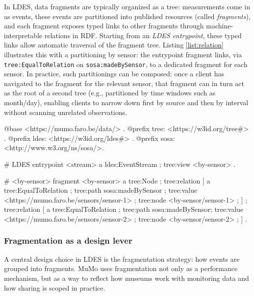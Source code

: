 In LDES, data fragments are typically organized as a tree: measurements
come in as events, these events are partitioned into published resources
(called \emph{fragments}), and each fragment exposes typed links to
other fragments through machine-interpretable relations in RDF. Starting
from an \emph{LDES entrypoint}, these typed links allow automatic
traversal of the fragment tree. Listing \ref{list:relation} illustrates
this with a partitioning by sensor: the entrypoint fragment links, via
\texttt{tree:EqualToRelation} on \texttt{sosa:madeBySensor}, to a
dedicated fragment for each sensor. In practice, such partitionings can
be composed: once a client has navigated to the fragment for the
relevant sensor, that fragment can in turn act as the root of a second
tree (e.g., partitioned by time windows such as month/day), enabling
clients to narrow down first by source and then by interval without
scanning unrelated observations.

\begin{lstlistingsp}[language=ttl,numbers=left,basicstyle=\ttfamily\footnotesize,breaklines=true,frame=single,
  caption={LDES fragmentation overview example, first fragmenting on location, then on group and lastly on time.},
  label={list:relation}]
@base <https://mumo.faro.be/data/> .
@prefix tree: <https://w3id.org/tree#> .
@prefix ldes: <https://w3id.org/ldes#> .
@prefix sosa: <http://www.w3.org/ns/sosa/>.

# LDES entrypoint
<stream>
  a ldes:EventStream ;
  tree:view <by-sensor> .

# <by-sensor> fragment
<by-sensor>
  a tree:Node ;
  tree:relation [
    a tree:EqualToRelation ;
    tree:path sosa:madeBySensor ;
    tree:value <https://mumo.faro.be/sensors/sensor-1> ;
    tree:node <by-sensor/sensor-1> ;
  ] ;
  tree:relation [
    a tree:EqualToRelation ;
    tree:path sosa:madeBySensor;
    tree:value <https://mumo.faro.be/sensors/sensor-2> ;
    tree:node <by-sensor/sensor-2> ;
  ] .
\end{lstlistingsp}

\subsubsection{Fragmentation as a design
lever}\label{fragmentation-as-a-design-lever}

A central design choice in LDES is the fragmentation strategy: how
events are grouped into fragments. MuMo uses fragmentation not only as a
performance mechanism, but as a way to reflect how museums work with
monitoring data and how sharing is scoped in practice.


